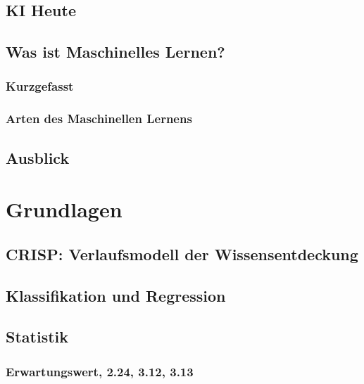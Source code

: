 	\section{KI Heute} %

	\section{Was ist Maschinelles Lernen?} %

		\subsection{Kurzgefasst} %

		\subsection{Arten des Maschinellen Lernens} %

	\section{Ausblick} %

\chapter{Grundlagen} %

	\section{CRISP: Verlaufsmodell der Wissensentdeckung} %

	\section{Klassifikation und Regression} %

	\section{Statistik} %

		\subsection{Erwartungswert, 2.24, 3.12, 3.13} %

